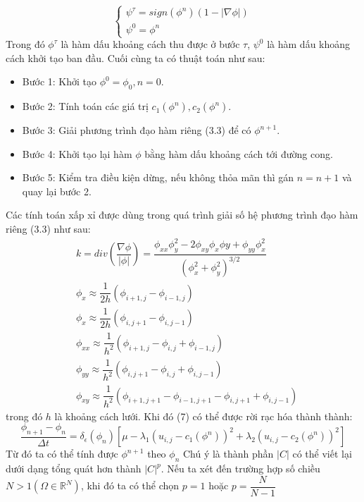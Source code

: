 \documentclass[12pt, oneside, a4paper]{book}
\begin{document}
\begin{equation}
\begin{cases}
 \psi^{\tau}=sign(\phi^n)(1-|\nabla \phi|)\\
 \psi^{0}=\phi^n
   \end{cases}
\end{equation}
 Trong đó $\phi^{\tau}$ là hàm dấu khoảng cách thu được ở bước $\tau$, $\psi^{0}$ là hàm dấu khoảng cách khởi tạo ban đầu. Cuối cùng ta có thuật toán như sau:
\begin{itemize}
\item Bước 1: Khởi tạo $\phi^0=\phi_0, n=0$.
\item Bước 2: Tính toán các giá trị $c_1(\phi^n), c_2(\phi^n)$.
\item Bước 3: Giải phương trình đạo hàm riêng (3.3) để có $\phi^{n+1}$.
\item Bước 4: Khởi tạo lại hàm $\phi$ bằng hàm dấu khoảng cách tới đường cong.
\item Bước 5: Kiểm tra điều kiện dừng, nếu không thỏa mãn thì gán $n=n+1$ và quay lại bước 2.
\end{itemize}
Các tính toán xấp xỉ được dùng trong quá trình giải số hệ phương trình đạo hàm riêng (3.3) như sau:
\begin{equation}
\begin{split}
&k=div(\dfrac{\nabla \phi}{|\phi|})=\dfrac{\phi_{xx}\phi^2_{y}-2\phi_{xy}\phi_{x}\phi{y}+\phi_{yy}\phi^2_{x}}{(\phi^2_x+\phi^2_y)^{3/2}}\\
&\phi_x\approx \dfrac{1}{2h}(\phi_{i+1,j}-\phi_{i-1,j}) \\ 
&\phi_x\approx \dfrac{1}{2h}(\phi_{i,j+1}-\phi_{i,j-1}) \\
&\phi_{xx}\approx \dfrac{1}{h^2}(\phi_{i+1,j}-\phi_{i,j}+\phi_{i-1,j}) \\
&\phi_{yy}\approx \dfrac{1}{h^2}(\phi_{i,j+1}-\phi_{i,j}+\phi_{i,j-1}) \\
&\phi_{xy}\approx \dfrac{1}{h^2}(\phi_{i+1,j+1}-\phi_{i-1,j+1}-\phi_{i,j+1}+\phi_{i,j-1}) 
\end{split}
\end{equation}
trong đó $h$ là khoảng cách lưới. Khi đó (7) có thể được rời rạc hóa thành thành: 
\begin{equation}
\dfrac{\phi_{n+1}-\phi_{n}}{\Delta t}=\delta_{\epsilon}(\phi_{n})[\mu -\lambda_1 (u_{i,j}-c_1(\phi^{n}))^2+\lambda_2 (u_{i,j}-c_2(\phi^{n}))^2]
\end{equation}
Từ đó ta có thể tính được $\phi^{n+1}$ theo $\phi_{n}$
Chú ý là thành phần $|C|$ có thể viết lại dưới dạng tổng quát hơn thành $|C|^p$. Nếu ta xét đến trường hợp số chiều $N>1(\Omega \in \mathbb{R}^N )$, khi đó ta có thể chọn $p=1$ hoặc $p=\dfrac{N}{N-1}$
\end{document}
